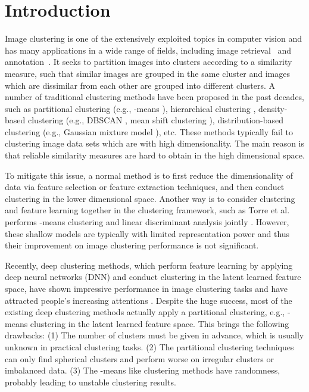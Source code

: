 \documentclass[10pt,twocolumn,letterpaper]{article}
\begin{document}
\section{Introduction}\label{sec:introduction}
Image clustering is one of the extensively exploited topics in computer vision and has many applications in a wide range of fields, including image retrieval~\cite{Chen2005Clue, Xie2015IntegratingIC} and annotation~\cite{Li2006Realtime}. 
It seeks to partition images into clusters according to a similarity measure, such that similar images are grouped in the same cluster and images which are dissimilar from each other are grouped into different clusters. 
A number of traditional clustering methods have been proposed in the past decades, such as partitional clustering (e.g., -means \cite{MACQUEEN1967SomeMF}), hierarchical clustering \cite{Jain:clustering}, density-based clustering (e.g., DBSCAN \cite{ester1996density}, mean shift clustering \cite{Dorin2002mean,Ren2014Boosted}), distribution-based clustering (e.g., Gaussian mixture model \cite{Bishop2006Pattern_SR}), etc. 
These methods typically fail to clustering image data sets which are with high dimensionality. The main reason is that reliable similarity measures are hard to obtain in the high dimensional space. 

To mitigate this issue, a normal method is to first reduce the dimensionality of data via feature selection or feature extraction techniques, and then conduct clustering in the lower dimensional space. Another way is to consider clustering and feature learning together in the clustering framework, such as Torre et al. performs -means clustering and linear discriminant analysis jointly \cite{Fernando2006DCA}.
However, these shallow models are typically with limited representation power and thus their improvement on image clustering performance is not significant.

Recently, deep clustering methods, which perform feature learning by applying deep neural networks (DNN) and conduct clustering in the latent learned feature space, have shown impressive performance in image clustering tasks and have attracted people's increasing attentions \cite{chang2017deep,Guo2018DEC-DA,Peng2016Deep,tian2014learning,Xie2016UnsupervisedDE,Yang2017towards,yang2016joint}. 
Despite the huge success, most of the existing deep clustering methods actually apply a partitional clustering, e.g., -means clustering in the latent learned feature space. This brings the following drawbacks:
(1) The number of clusters must be given in advance, which is usually unknown in practical clustering tasks. (2) The partitional clustering techniques can only find spherical clusters and perform worse on irregular clusters or imbalanced data. (3) The -means like clustering methods have randomness, probably leading to unstable clustering results.
\end{document}
